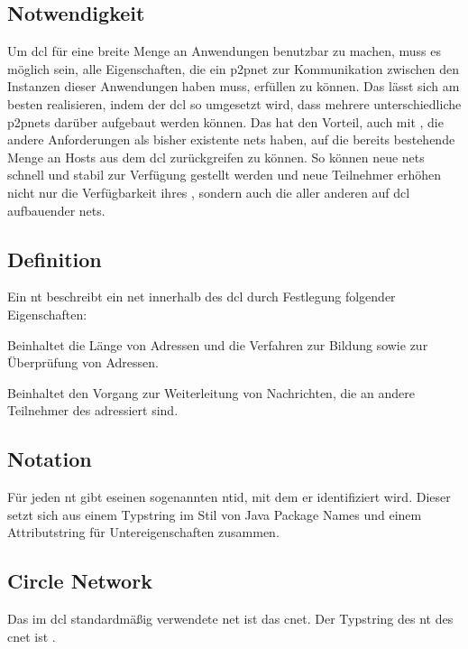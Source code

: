 
\subsection{Notwendigkeit}
Um \gls{dcl} für eine breite Menge an Anwendungen benutzbar zu machen, muss es möglich sein, alle
Eigenschaften, die ein \gls{p2pnet} zur Kommunikation zwischen den Instanzen dieser Anwendungen
haben muss, erfüllen zu können. Das lässt sich am besten realisieren, indem der \gls{dcl} so umgesetzt
wird, dass mehrere unterschiedliche \glspl{p2pnet} darüber aufgebaut werden können.
Das hat den Vorteil, auch mit , die andere Anforderungen
als bisher existente \glspl{net} haben, auf die bereits bestehende Menge an Hosts aus dem \gls{dcl}
zurückgreifen zu können. So können neue \glspl{net} schnell und stabil zur Verfügung gestellt werden
und neue Teilnehmer erhöhen nicht nur die Verfügbarkeit ihres , sondern auch
die aller anderen auf \gls{dcl} aufbauender \glspl{net}.

\subsection{Definition}
Ein \gls{nt} beschreibt ein \gls{net} innerhalb des \gls{dcl} durch Festlegung folgender Eigenschaften:

\begin{description}

		Beinhaltet die Länge von Adressen und die Verfahren zur Bildung sowie zur Überprüfung
		von Adressen.

		Beinhaltet den Vorgang zur Weiterleitung von Nachrichten, die an andere Teilnehmer des
		 adressiert sind.

\end{description}

\subsection{Notation}
Für jeden \gls{nt} gibt eseinen sogenannten \gls{ntid}, mit dem er identifiziert wird.
Dieser setzt sich aus einem Typstring im Stil von Java Package Names und einem Attributstring für
Untereigenschaften zusammen.

\subsection{Circle Network}
Das im \gls{dcl} standardmäßig verwendete \gls{net} ist das \gls{cnet}. Der Typstring des \gls{nt} des
\gls{cnet} ist \code{\cnettype}.

